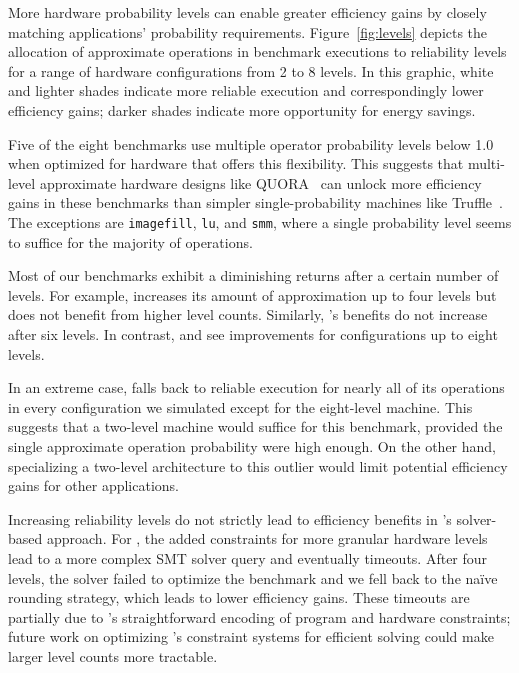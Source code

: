 \documentclass[10pt,nocopyrightspace,preprint]{sigplanconf}
\newcommand{\code}{\lstinline[emphstyle={},keywordstyle={}]}
\begin{document}
\begin{figure*}
    \hspace{-3ex}
    
    \caption{Operator probability breakdowns. Each bar shows a hardware
    configuration with a different number of levels.
    Darker shades indicate lower probabilities and correspondingly higher
    potential energy savings.
    Bars marked $\star$ used
    the cheaper rounding strategy instead of solving to determine levels.}
    \label{fig:levels}
\end{figure*}

More hardware probability levels can enable greater efficiency gains by
closely matching applications' probability requirements.
Figure~\ref{fig:levels} depicts the allocation of approximate operations in benchmark
executions to reliability levels for a range of hardware configurations
from 2 to 8 levels.
In this graphic, white and lighter shades indicate more reliable execution and
correspondingly lower efficiency gains; darker shades indicate more
opportunity for energy savings.

Five of the eight benchmarks use multiple operator probability levels below
1.0 when optimized for hardware that offers this flexibility.
This suggests that multi-level approximate hardware designs like
QUORA~\cite{quora} can unlock more efficiency gains in these benchmarks than simpler
single-probability machines like Truffle~\cite{truffle}.
The exceptions are \code{imagefill}, \code{lu}, and \code{smm}, where a single
probability level seems to suffice for the majority of operations.

Most of our benchmarks exhibit a diminishing returns after a certain number of
levels.
For example,  increases its amount of approximation up to four levels
but does not benefit from higher level counts.
Similarly, 's benefits do not increase after six levels.
In contrast,  and  see improvements
for configurations up to eight levels.

In an extreme case,  falls back to reliable execution for nearly all
of its operations in every configuration we simulated except for the
eight-level machine.
This suggests that a two-level machine would suffice for this benchmark,
provided the single approximate operation probability were high enough.
On the other hand, specializing a two-level architecture to this outlier
would limit potential efficiency gains for other applications.

Increasing reliability levels do not strictly lead to efficiency benefits in
\lang's solver-based approach.
For , the added constraints for more granular hardware levels lead
to a more complex SMT solver query and eventually timeouts.
After four levels, the solver failed to optimize the benchmark and we fell back
to the na\"ive rounding strategy, which leads to lower efficiency gains.
These timeouts are partially due to \lang's straightforward encoding of
program and hardware constraints;
future work on optimizing \lang's constraint systems for efficient solving
could make larger level counts more tractable.
\end{document}
